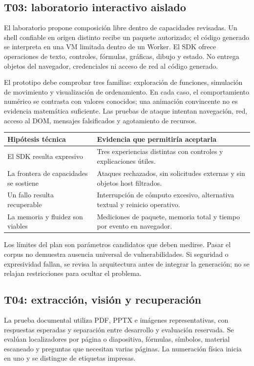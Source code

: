 \subsection{T03: laboratorio interactivo aislado}
El laboratorio propone composición libre dentro de capacidades revisadas. Un shell confiable en origen distinto recibe un paquete autorizado; el código generado se interpreta en una VM limitada dentro de un Worker. El SDK ofrece operaciones de texto, controles, fórmulas, gráficas, dibujo y estado. No entrega objetos del navegador, credenciales ni acceso de red al código generado.

El prototipo debe comprobar tres familias: exploración de funciones, simulación de movimiento y visualización de ordenamiento. En cada caso, el comportamiento numérico se contrasta con valores conocidos; una animación convincente no es evidencia matemática suficiente. Las pruebas de ataque intentan navegación, red, acceso al DOM, mensajes falsificados y agotamiento de recursos.

\small
\begin{tabularx}{\linewidth}{P{3.6cm}Y}
\toprule
\textbf{Hipótesis técnica} & \textbf{Evidencia que permitiría aceptarla}\\
\midrule
El SDK resulta expresivo & Tres experiencias distintas con controles y explicaciones útiles.\\
La frontera de capacidades se sostiene & Ataques rechazados, sin solicitudes externas y sin objetos host filtrados.\\
Un fallo resulta recuperable & Interrupción de cómputo excesivo, alternativa textual y reinicio operativo.\\
La memoria y fluidez son viables & Mediciones de paquete, memoria total y tiempo por evento en navegador.\\
\bottomrule
\end{tabularx}
\normalsize
Los límites del plan son parámetros candidatos que deben medirse. Pasar el corpus no demuestra ausencia universal de vulnerabilidades. Si seguridad o expresividad fallan, se revisa la arquitectura antes de integrar la generación; no se relajan restricciones para ocultar el problema.

\subsection{T04: extracción, visión y recuperación}
La prueba documental utiliza PDF, PPTX e imágenes representativas, con respuestas esperadas y separación entre desarrollo y evaluación reservada. Se evalúan localizadores por página o diapositiva, fórmulas, símbolos, material escaneado y preguntas que necesitan varias páginas. La numeración física inicia en uno y se distingue de etiquetas impresas.

